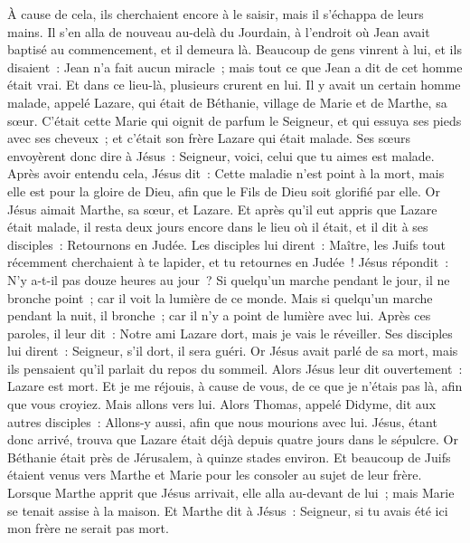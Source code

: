 \begin{multicols}{2}
À cause de cela, ils cherchaient encore à le saisir, mais il s'échappa de leurs mains.
Il s'en alla de nouveau au-delà du Jourdain, à l'endroit où Jean avait baptisé au commencement, et il demeura là.
Beaucoup de gens vinrent à lui, et ils disaient~: Jean n'a fait aucun miracle~; mais tout ce que Jean a dit de cet homme était vrai.
Et dans ce lieu-là, plusieurs crurent en lui.
\VerseOne{}Il y avait un certain homme malade, appelé Lazare, qui était de Béthanie, village de Marie et de Marthe, sa sœur.
C'était cette Marie qui oignit de parfum le Seigneur, et qui essuya ses pieds avec ses cheveux~; et c'était son frère Lazare qui était malade.
Ses sœurs envoyèrent donc dire à Jésus~: Seigneur, voici, celui que tu aimes est malade.
Après avoir entendu cela, Jésus dit~: Cette maladie n'est point à la mort, mais elle est pour la gloire de Dieu, afin que le Fils de Dieu soit glorifié par elle.
Or Jésus aimait Marthe, sa sœur, et Lazare.
Et après qu'il eut appris que Lazare était malade, il resta deux jours encore dans le lieu où il était,
et il dit à ses disciples~: Retournons en Judée.
Les disciples lui dirent~: Maître, les Juifs tout récemment cherchaient à te lapider, et tu retournes en Judée~!
Jésus répondit~: N'y a-t-il pas douze heures au jour~? Si quelqu'un marche pendant le jour, il ne bronche point~; car il voit la lumière de ce monde.
Mais si quelqu'un marche pendant la nuit, il bronche~; car il n'y a point de lumière avec lui.
Après ces paroles, il leur dit~: Notre ami Lazare dort, mais je vais le réveiller.
Ses disciples lui dirent~: Seigneur, s'il dort, il sera guéri.
Or Jésus avait parlé de sa mort, mais ils pensaient qu'il parlait du repos du sommeil.
Alors Jésus leur dit ouvertement~: Lazare est mort.
Et je me réjouis, à cause de vous, de ce que je n'étais pas là, afin que vous croyiez. Mais allons vers lui.
Alors Thomas, appelé Didyme, dit aux autres disciples~: Allons-y aussi, afin que nous mourions avec lui.
Jésus, étant donc arrivé, trouva que Lazare était déjà depuis quatre jours dans le sépulcre.
Or Béthanie était près de Jérusalem, à quinze stades environ.
Et beaucoup de Juifs étaient venus vers Marthe et Marie pour les consoler au sujet de leur frère.
Lorsque Marthe apprit que Jésus arrivait, elle alla au-devant de lui~; mais Marie se tenait assise à la maison.
Et Marthe dit à Jésus~: Seigneur, si tu avais été ici mon frère ne serait pas mort.

\end{multicols}
